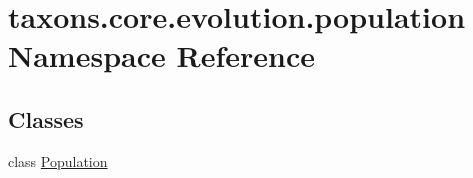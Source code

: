 \hypertarget{namespacetaxons_1_1core_1_1evolution_1_1population}{}\section{taxons.\+core.\+evolution.\+population Namespace Reference}
\label{namespacetaxons_1_1core_1_1evolution_1_1population}
\subsection*{Classes}
\begin{DoxyCompactItemize}
\item 
class \hyperlink{classtaxons_1_1core_1_1evolution_1_1population_1_1_population}{Population}
\end{DoxyCompactItemize}
